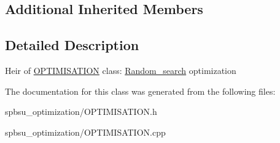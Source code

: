 \subsection*{Additional Inherited Members}


\subsection{Detailed Description}
Heir of \hyperlink{class_o_p_t_i_m_i_s_a_t_i_o_n}{O\+P\+T\+I\+M\+I\+S\+A\+T\+I\+ON} class\+: \hyperlink{class_random__search}{Random\+\_\+search} optimization 

The documentation for this class was generated from the following files\+:\begin{DoxyCompactItemize}
\item 
spbsu\+\_\+optimization/O\+P\+T\+I\+M\+I\+S\+A\+T\+I\+O\+N.\+h\item 
spbsu\+\_\+optimization/O\+P\+T\+I\+M\+I\+S\+A\+T\+I\+O\+N.\+cpp\end{DoxyCompactItemize}
